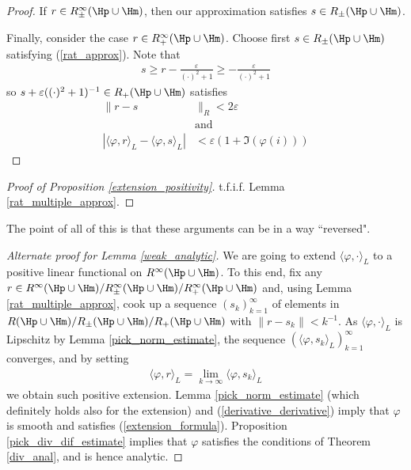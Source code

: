 \begin{proof}
	If $r \in R^{\infty}_{\pm}(\Hp \cup \Hm)$, then our approximation satisfies $s \in R_{\pm}(\Hp \cup \Hm)$.

	Finally, consider the case $r \in R^{\infty}_{+}(\Hp \cup \Hm)$. Choose first $s \in R_{\pm}(\Hp \cup \Hm)$ satisfying (\ref{rat_approx}). Note that
	\begin{align*}
		s \geq r - \frac{\varepsilon}{(\cdot)^2 + 1} \geq -\frac{\varepsilon}{(\cdot)^2 + 1}
	\end{align*}
	so $s + \varepsilon ((\cdot)^2 + 1)^{-1} \in R_{+}(\Hp \cup \Hm)$ satisfies
	\begin{align*}
		\|r - s&\|_{R} < 2\varepsilon \nonumber\\
		&\text{and } \\
		|\langle \varphi, r\rangle_{L} -  \langle \varphi, s\rangle_{L}|& < \varepsilon (1 + \Im(\varphi(i)))
	\end{align*}
\end{proof}

\begin{proof}[Proof of Proposition \ref{extension_positivity}]
	t.f.i.f. Lemma \ref{rat_multiple_approx}.
\end{proof}

The point of all of this is that these arguments can be in a way ``reversed".

\begin{proof}[Alternate proof for Lemma \ref{weak_analytic}]
	We are going to extend $\langle \varphi, \cdot\rangle_{L}$ to a positive linear functional on $R^{\infty}(\Hp \cup \Hm)$. To this end, fix any $r \in R^{\infty}(\Hp \cup \Hm)/R^{\infty}_{\pm}(\Hp \cup \Hm)/R^{\infty}_{+}(\Hp \cup \Hm)$ and, using Lemma \ref{rat_multiple_approx}, cook up a sequence $(s_{k})_{k = 1}^{\infty}$ of elements in $R(\Hp \cup \Hm)/R_{\pm}(\Hp \cup \Hm)/R_{+}(\Hp \cup \Hm)$ with $\|r - s_{k}\| < k^{-1}$. As $\langle \varphi, \cdot\rangle_{L}$ is Lipschitz by Lemma \ref{pick_norm_estimate}, the sequence $(\langle \varphi, s_{k} \rangle_{L})_{k = 1}^{\infty}$ converges, and by setting
	\begin{align*}
		\langle \varphi, r\rangle_{L} = \lim_{k \to \infty} \langle \varphi, s_{k}\rangle_{L}
	\end{align*}
	we obtain such positive extension. Lemma \ref{pick_norm_estimate} (which definitely holds also for the extension) and (\ref{derivative_derivative}) imply that $\varphi$ is smooth and satisfies (\ref{extension_formula}). Proposition \ref{pick_div_dif_estimate} implies that $\varphi$ satisfies the conditions of Theorem \ref{div_anal}, and is hence analytic.
\end{proof}

